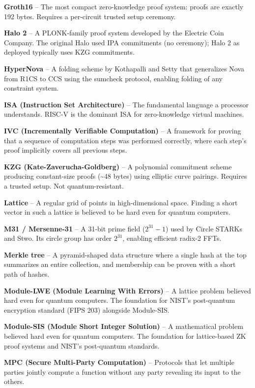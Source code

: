 \documentclass[
  11pt,
  openany]{report}
\renewcommand{\textbf}[1]{{\bfseries\color{MidnightBold}#1}}
\begin{document}
\textbf{Groth16} -- The most compact zero-knowledge proof system: proofs are
exactly 192 bytes. Requires a per-circuit trusted setup ceremony.

\textbf{Halo 2} -- A PLONK-family proof system developed by the Electric Coin
Company. The original Halo used IPA commitments (no ceremony); Halo 2 as
deployed typically uses KZG commitments.

\textbf{HyperNova} -- A folding scheme by Kothapalli and Setty that generalizes
Nova from R1CS to CCS using the sumcheck protocol, enabling folding of any
constraint system.

\textbf{ISA (Instruction Set Architecture)} -- The fundamental language a
processor understands. RISC-V is the dominant ISA for zero-knowledge virtual
machines.

\textbf{IVC (Incrementally Verifiable Computation)} -- A framework for proving
that a sequence of computation steps was performed correctly, where each step's
proof implicitly covers all previous steps.

\textbf{KZG (Kate-Zaverucha-Goldberg)} -- A polynomial commitment scheme
producing constant-size proofs (\textasciitilde48 bytes) using elliptic curve
pairings. Requires a trusted setup. Not quantum-resistant.

\textbf{Lattice} -- A regular grid of points in high-dimensional space. Finding
a short vector in such a lattice is believed to be hard even for quantum
computers.

\textbf{M31 / Mersenne-31} -- A 31-bit prime field (\(2^{31} - 1\)) used by
Circle STARKs and Stwo. Its circle group has order \(2^{31}\), enabling
efficient radix-2 FFTs.

\textbf{Merkle tree} -- A pyramid-shaped data structure where a single hash at
the top summarizes an entire collection, and membership can be proven with a
short path of hashes.

\textbf{Module-LWE (Module Learning With Errors)} -- A lattice problem believed
hard even for quantum computers. The foundation for NIST's post-quantum
encryption standard (FIPS 203) alongside Module-SIS.

\textbf{Module-SIS (Module Short Integer Solution)} -- A mathematical problem
believed hard even for quantum computers. The foundation for lattice-based ZK
proof systems and NIST's post-quantum standards.

\textbf{MPC (Secure Multi-Party Computation)} -- Protocols that let multiple
parties jointly compute a function without any party revealing its input to the
others.
\end{document}
